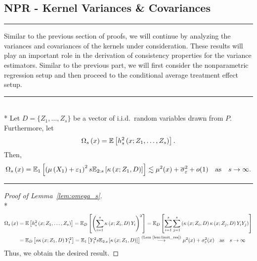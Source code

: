 \subsection{NPR - Kernel Variances \& Covariances}
\hrule
Similar to the previous section of proofs, we will continue by analyzing the variances and covariances of the kernels under consideration.
These results will play an important role in the derivation of consistency properties for the variance estimators.
Similar to the previous part, we will first consider the nonparametric regression setup and then proceed to the conditional average treatment effect setup.
\vspace{0.5cm}
\hrule
\begin{lem}\label{lem:omega_s}\mbox{}\\*
	Let $D = \{Z_1, \dotsc, Z_{s}\}$ be a vector of i.i.d.\ random variables drawn from $P$.
	Furthermore, let
	\begin{equation}
		\Omega_{s}\left(x\right)
		= \mathbb{E}\left[h_{s}^{2}\left(x; Z_1, \ldots,  Z_{s}\right)\right].
	\end{equation}
	Then,
	\begin{equation}
		\Omega_{s}\left(x\right)
		= \mathbb{E}_{1}\left[\left(\mu\left(X_1\right)+ \varepsilon_1\right)^2 s \mathbb{E}_{2:s}\left[\kappa\left(x; Z_1, D\right)\right]\right]
		\lesssim \mu^2(x) + \overline{\sigma}_{\varepsilon}^2 + o(1)
		\quad \text{as} \quad s \rightarrow \infty.
	\end{equation}
\end{lem}
\hrule
\begin{proof}[Proof of Lemma~\ref{lem:omega_s}]\mbox{}\\*
	\begin{equation}
		\begin{aligned}
			\Omega_{s}\left(x\right)
			 & = \mathbb{E}\left[h_{s}^{2}\left(x; Z_1, \ldots,  Z_{s}\right)\right]
			= \mathbb{E}_{D}\left[\left(\sum_{i = 1}^{s}\kappa\left(x; Z_{i}, D\right)Y_{i}\right)^2\right]
			= \mathbb{E}_{D}\left[\sum_{i = 1}^{s}\sum_{j = 1}^{s}\left(\kappa\left(x; Z_{i}, D\right)\kappa\left(x; Z_{j}, D\right)Y_{i}Y_{j}\right)\right] \\
			 & = \mathbb{E}_{D}\left[s \kappa\left(x; Z_{1}, D\right)Y_{1}^2\right]
			= \mathbb{E}_{1}\left[Y_{1}^2 s \mathbb{E}_{2:s}\left[\kappa\left(x; Z_{1}, D\right)\right]\right]                   
			\overset{\text{(Lem~\ref{lem:limit_res})}}{\longrightarrow} \mu^2(x) + \sigma_{\varepsilon}^2(x)
			 \quad \text{as} \quad s \rightarrow \infty
		\end{aligned}
	\end{equation}
	Thus, we obtain the desired result.
\end{proof}

